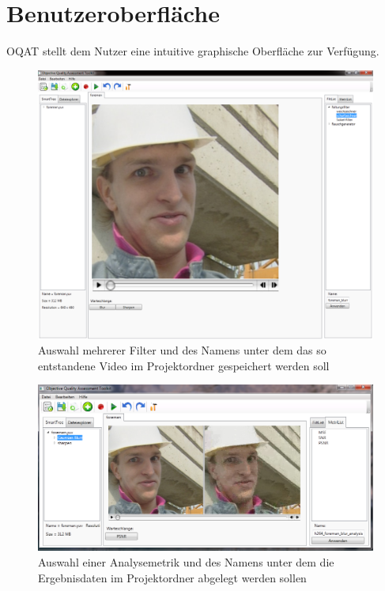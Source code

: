 \chapter{Benutzeroberfläche}
\setcounter{counterKriterien}{0}


\gls{OQAT} stellt dem Nutzer eine intuitive graphische Oberfläche zur Verfügung.

\begin{figure}[p]
\includegraphics[scale=0.35]{bilder/screenFilter.png}
\caption{Auswahl mehrerer Filter und des Namens unter dem das so entstandene Video im
Projektordner gespeichert werden soll}
\label{screenFilter}
\end{figure}
\begin{figure}[p]
\includegraphics[scale=0.6]{bilder/screenAnalys.png}
\caption{Auswahl einer Analysemetrik und des Namens unter dem die Ergebnisdaten im 
Projektordner abgelegt werden sollen}
\label{screenAnalys}
\end{figure}
